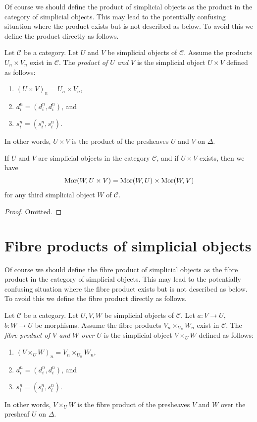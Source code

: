 \noindent
Of course we should define the product of simplicial objects
as the product in the category of simplicial objects. This
may lead to the potentially confusing situation where the product exists
but is not described as below. To avoid this we define the product
directly as follows.

\begin{definition}
\label{definition-product}
Let $\mathcal{C}$ be a category.
Let $U$ and $V$ be simplicial objects of $\mathcal{C}$.
Assume the products $U_n \times V_n$ exist in $\mathcal{C}$.
The {\it product of $U$ and $V$} is the simplicial object
$U \times V$ defined as follows:
\begin{enumerate}
\item $(U \times V)_n = U_n \times V_n$,
\item $d^n_i = (d^n_i, d^n_i)$, and
\item $s^n_i = (s^n_i, s^n_i)$.
\end{enumerate}
In other words, $U \times V$ is the product of the presheaves
$U$ and $V$ on $\Delta$.
\end{definition}

\begin{lemma}
\label{lemma-product}
If $U$ and $V$ are simplicial objects in the category $\mathcal{C}$,
and if $U \times V$ exists, then we have
$$
\mathop{\mathrm{Mor}}\nolimits(W, U \times V) =
\mathop{\mathrm{Mor}}\nolimits(W, U) \times
\mathop{\mathrm{Mor}}\nolimits(W, V)
$$
for any third simplicial object $W$ of $\mathcal{C}$.
\end{lemma}

\begin{proof}
Omitted.
\end{proof}


\section{Fibre products of simplicial objects}
\label{section-fibre-products}

\noindent
Of course we should define the fibre product of simplicial objects
as the fibre product in the category of simplicial objects. This
may lead to the potentially confusing situation where the
fibre product exists but is not described as below. To avoid
this we define the fibre product directly as follows.

\begin{definition}
\label{definition-fibre-product}
Let $\mathcal{C}$ be a category.
Let $U, V, W$ be simplicial objects of $\mathcal{C}$.
Let $a : V \to U$, $b : W \to U$ be morphisms.
Assume the fibre products $V_n \times_{U_n} W_n$ exist in $\mathcal{C}$.
The {\it fibre product of $V$ and $W$ over $U$} is the simplicial object
$V \times_U W$ defined as follows:
\begin{enumerate}
\item $(V \times_U W)_n = V_n \times_{U_n} W_n$,
\item $d^n_i = (d^n_i, d^n_i)$, and
\item $s^n_i = (s^n_i, s^n_i)$.
\end{enumerate}
In other words, $V \times_U W$ is the fibre product of the presheaves
$V$ and $W$ over the presheaf $U$ on $\Delta$.
\end{definition}

